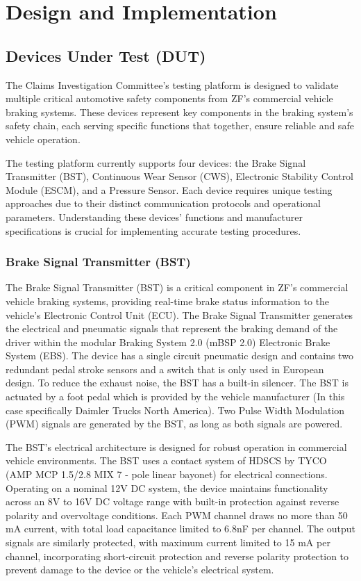 \documentclass[12pt]{article}
\begin{document}
\section{Design and Implementation}
\subsection{Devices Under Test (DUT)} The Claims Investigation Committee's
testing platform is designed to validate multiple critical automotive safety
components from ZF's commercial vehicle braking systems. These devices
represent key components in the braking system's safety chain, each serving
specific functions that together, ensure reliable and safe vehicle operation.

The testing platform currently supports four devices: the Brake Signal
Transmitter (BST), Continuous Wear Sensor (CWS), Electronic Stability Control
Module (ESCM), and a Pressure Sensor. Each device requires unique testing
approaches due to their distinct communication protocols and operational
parameters. Understanding these devices' functions and manufacturer
specifications is crucial for implementing accurate testing procedures. 

\subsubsection{Brake Signal Transmitter (BST)}

The Brake Signal Transmitter (BST) is a critical component in ZF's commercial
vehicle braking systems, providing real-time brake status information to the
vehicle's Electronic Control Unit (ECU). The Brake Signal Transmitter generates
the electrical and pneumatic signals that represent the braking demand of the
driver within the modular Braking System 2.0 (mBSP 2.0) Electronic Brake System
(EBS). The device has a single circuit pneumatic design and contains two
redundant pedal stroke sensors and a switch that is only used in European
design. To reduce the exhaust noise, the BST has a built-in silencer. The BST
is actuated by a foot pedal which is provided by the vehicle manufacturer (In
this case specifically Daimler Trucks North America). Two Pulse Width
Modulation (PWM) signals are generated by the BST, as long as both signals are
powered.

The BST's electrical architecture is designed for robust operation in
commercial vehicle environments. The BST uses a contact system of HDSCS by TYCO
(AMP MCP 1.5/2.8 MIX 7 - pole linear bayonet) for electrical connections.
Operating on a nominal 12V DC system, the device maintains functionality across
an 8V to 16V DC voltage range with built-in protection against reverse polarity
and overvoltage conditions. Each PWM channel draws no more than 50 mA current,
with total load capacitance limited to 6.8nF per channel. The output signals
are similarly protected, with maximum current limited to 15 mA per channel,
incorporating short-circuit protection and reverse polarity protection to
prevent damage to the device or the vehicle's electrical system.
\end{document}
